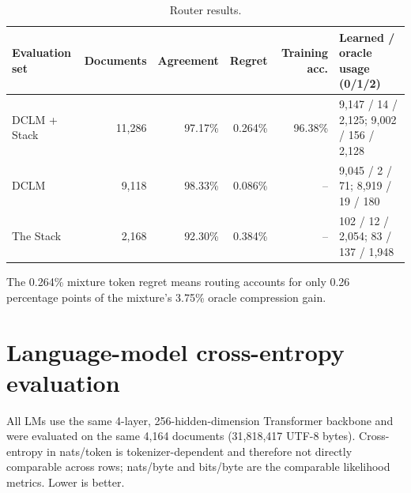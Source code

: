 \documentclass[10pt]{article}
\begin{document}
\begin{table}[H]
\centering
\scriptsize
\caption{Router results.}
\begin{tabular}{lrrrrl}
\toprule
Evaluation set & Documents & Agreement & Regret & Training acc. & Learned / oracle usage (0/1/2) \\
\midrule
DCLM + Stack & 11,286 & 97.17\% & 0.264\% & 96.38\% & 9,147 / 14 / 2,125; 9,002 / 156 / 2,128 \\
DCLM & 9,118 & 98.33\% & 0.086\% & -- & 9,045 / 2 / 71; 8,919 / 19 / 180 \\
The Stack & 2,168 & 92.30\% & 0.384\% & -- & 102 / 12 / 2,054; 83 / 137 / 1,948 \\
\bottomrule
\end{tabular}
\end{table}

The 0.264\% mixture token regret means routing accounts for only 0.26 percentage points of the mixture's 3.75\% oracle compression gain.

\section{Language-model cross-entropy evaluation}

All LMs use the same 4-layer, 256-hidden-dimension Transformer backbone and were evaluated on the same 4,164 documents (31,818,417 UTF-8 bytes). Cross-entropy in nats/token is tokenizer-dependent and therefore not directly comparable across rows; nats/byte and bits/byte are the comparable likelihood metrics. Lower is better.

\begin{table}[H]
\centering
\scriptsize
\caption{Held-out language-model cross-entropy.}
\end{table}
\end{document}
